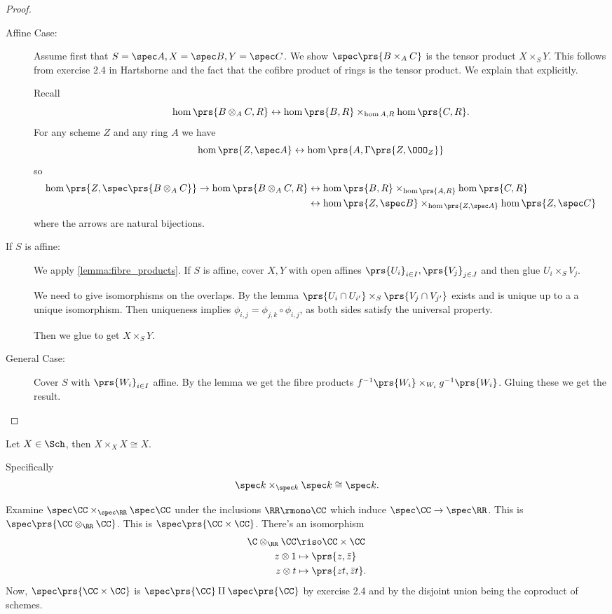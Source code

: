\documentclass[10pt,a4paper,twoside,openany,hidelinks]{book}
\begin{document}
\begin{proof}
\begin{description}
\item[Affine Case:]
Assume first that $S = \spec A, X = \spec B, Y = \spec C$. We show $\spec \prs{B \times_A C}$ is the tensor product $X \times_S Y$.
This follows from exercise 2.4 in Hartshorne and the fact that the cofibre product of rings is the tensor product. We explain that explicitly.

Recall
$$\hom\prs{B \otimes_A C, R} \leftrightarrow \hom\prs{B, R} \times_{\hom A,R} \hom\prs{C,R} \text{.}$$
For any scheme $Z$ and any ring $A$ we have
$$\hom\prs{Z, \spec A} \leftrightarrow \hom\prs{A, \Gamma\prs{Z, \OOO_Z}}$$
so
\begin{align*}
    \hom\prs{Z, \spec\prs{B \otimes_A C}} \to \hom\prs{B \otimes_A C, R} &\leftrightarrow \hom\prs{B, R} \times_{\hom\prs{A,R}} \hom\prs{C, R} \\&\leftrightarrow \hom\prs{Z, \spec B} \times_{\hom\prs{Z, \spec A}} \hom\prs{Z, \spec C}
\end{align*}
where the arrows are natural bijections.
\item[If $S$ is affine:]
We apply \ref{lemma:fibre_products}. If $S$ is affine, cover $X,Y$ with open affines $\prs{U_i}_{i \in I}, \prs{V_j}_{j \in J}$ and then glue $U_i \times_S V_j$.

We need to give isomorphisms on the overlaps. By the lemma $\prs{U_i \cap U_{i'}} \times_S \prs{V_j \cap V_{j'}}$ exists and is unique up to a a unique isomorphism.
Then uniqueness implies $\phi_{i,j} = \phi_{j,k} \circ \phi_{i,j}$, as both sides satisfy the universal property.

Then we glue to get $X \times_S Y$.

\item[General Case:]
Cover $S$ with $\prs{W_i}_{i \in I}$ affine. By the lemma we get the fibre products $f^{-1}\prs{W_i} \times_{W_i} g^{-1}\prs{W_i}$. Gluing these we get the result.
\end{description}
\end{proof}

\begin{example}
Let $X \in \Sch$, then $X \times_X X \cong X$.

Specifically $$\spec k \times_{\spec k} \spec k \cong \spec k \text{.}$$
\end{example}

\begin{example}
Examine $\spec \CC \times_{\spec \RR} \spec \CC$ under the inclusions $\RR \rmono \CC$ which induce $\spec \CC \to \spec \RR$. This is $\spec \prs{\CC \otimes_{\RR} \CC}$. This is $\spec\prs{\CC \times \CC}$.
There's an isomorphism
\begin{align*}
    \C \otimes_\RR \CC &\riso \CC \times \CC \\
    z \otimes 1 &\mapsto \prs{z, \bar{z}} \\
    z \otimes t &\mapsto \prs{zt, \bar{z} t} \text{.}
\end{align*}
Now, $\spec\prs{\CC \times \CC}$ is $\spec\prs{\CC} \amalg \spec\prs{\CC}$ by exercise 2.4 and by the disjoint union being the coproduct of schemes.
\end{example}
\end{document}
